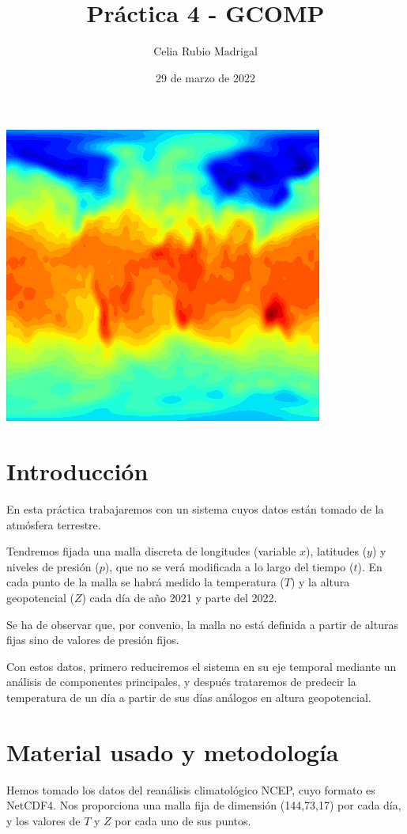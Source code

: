 \documentclass[a4paper]{article}
\author{Celia Rubio Madrigal}
\title{Práctica 4 - GCOMP}
\date{29 de marzo de 2022}
\begin{document}
	\maketitle
	
	\tableofcontents
	
	\vfill
	
	\begin{center}
			\includegraphics[width=0.5\linewidth]{portada}
	\end{center}
	
	
	\vfill
	\newpage
	
	\section{Introducción}
	En esta práctica trabajaremos con un sistema cuyos datos están tomado de la atmósfera terrestre. 
	
	Tendremos fijada una malla discreta de longitudes (variable $x$), latitudes ($y$) y niveles de presión ($p$), que no se verá modificada a lo largo del tiempo ($t$). En cada punto de la malla se habrá medido la temperatura ($T$) y la altura geopotencial ($Z$) cada día de año 2021 y parte del 2022.
	
	Se ha de observar que, por convenio, la malla no está definida a partir de alturas fijas sino de valores de presión fijos.
	
	Con estos datos, primero reduciremos el sistema en su eje temporal mediante un análisis de componentes principales, y después trataremos de predecir la temperatura de un día a partir de sus días análogos en altura geopotencial.
	
	
	\section{Material usado y metodología}
	Hemos tomado los datos del reanálisis climatológico NCEP, cuyo formato es NetCDF4. Nos proporciona una malla fija de dimensión (144,73,17) por cada día, y los valores de $T$ y $Z$ por cada uno de sus puntos.
	
\end{document}
